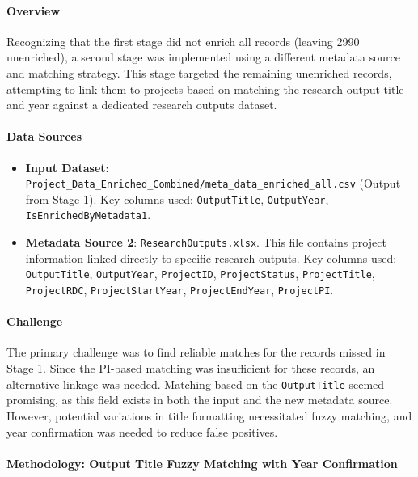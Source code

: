\documentclass[12pt]{article}
\providecommand{\tightlist}{%
  \setlength{\itemsep}{0pt}\setlength{\parskip}{0pt}}
\begin{document}
\paragraph{Overview}\label{overview-4}

Recognizing that the first stage did not enrich all records (leaving
2990 unenriched), a second stage was implemented using a different
metadata source and matching strategy. This stage targeted the remaining
unenriched records, attempting to link them to projects based on
matching the research output title and year against a dedicated research
outputs dataset.

\paragraph{Data Sources}\label{data-sources-3}

\begin{itemize}
\tightlist
\item
  \textbf{Input Dataset}:
  \texttt{Project\_Data\_Enriched\_Combined/meta\_data\_enriched\_all.csv}
  (Output from Stage 1). Key columns used: \texttt{OutputTitle},
  \texttt{OutputYear}, \texttt{IsEnrichedByMetadata1}.
\item
  \textbf{Metadata Source 2}: \texttt{ResearchOutputs.xlsx}. This file
  contains project information linked directly to specific research
  outputs. Key columns used: \texttt{OutputTitle}, \texttt{OutputYear},
  \texttt{ProjectID}, \texttt{ProjectStatus}, \texttt{ProjectTitle},
  \texttt{ProjectRDC}, \texttt{ProjectStartYear},
  \texttt{ProjectEndYear}, \texttt{ProjectPI}.
\end{itemize}

\paragraph{Challenge}\label{challenge-1}

The primary challenge was to find reliable matches for the records
missed in Stage 1. Since the PI-based matching was insufficient for
these records, an alternative linkage was needed. Matching based on the
\texttt{OutputTitle} seemed promising, as this field exists in both the
input and the new metadata source. However, potential variations in
title formatting necessitated fuzzy matching, and year confirmation was
needed to reduce false positives.

\paragraph{Methodology: Output Title Fuzzy Matching with Year
Confirmation}\label{methodology-output-title-fuzzy-matching-with-year-confirmation}
\end{document}
